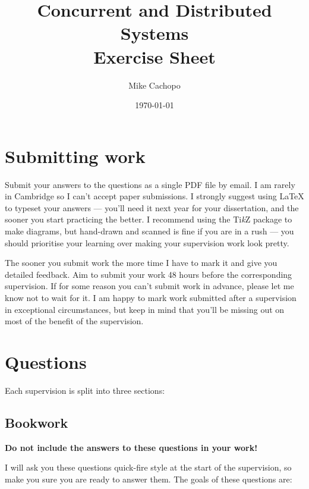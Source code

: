 \documentclass[12pt,a4paper,oneside,openright]{report}
\title{Concurrent and Distributed Systems\\ Exercise Sheet}
\date{\today}
\author{Mike Cachopo}
\begin{document}

\pagestyle{empty}

\maketitle

\newpage

\pagestyle{plain} 

\section*{Submitting work}

Submit your answers to the questions as a single PDF file by email. I
am rarely in Cambridge so I can't accept paper submissions. I strongly
suggest using LaTeX to typeset your answers --- you'll need it next
year for your dissertation, and the sooner you start practicing the
better. I recommend using the Ti\textit{k}Z package to make diagrams,
but hand-drawn and scanned is fine if you are in a rush --- you should
prioritise your learning over making your supervision work look
pretty.

The sooner you submit work the more time I have to mark it and give
you detailed feedback. Aim to submit your work 48 hours before the
corresponding supervision. If for some reason you can't submit work in
advance, please let me know not to wait for it. I am happy to mark
work submitted after a supervision in exceptional circumstances, but
keep in mind that you'll be missing out on most of the benefit of the
supervision.

\section*{Questions}

Each supervision is split into three sections:

\subsection*{Bookwork}

\textbf{Do not include the answers to these questions in your work!}

I will ask you these questions quick-fire style at the start of the
supervision, so make you sure you are ready to answer them. The goals
of these questions are:
\end{document}
